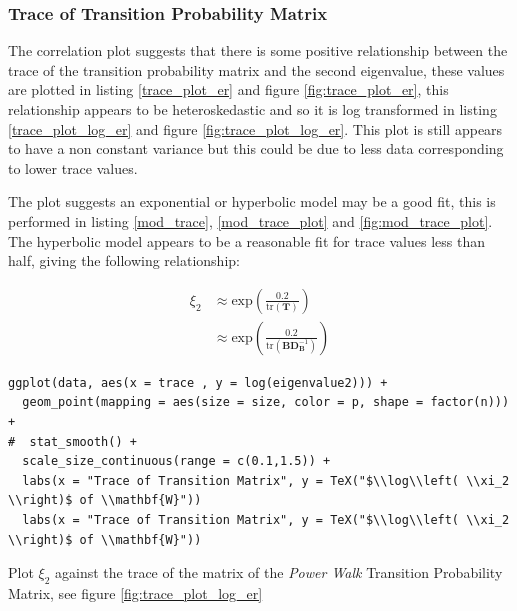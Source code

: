 \documentclass[11pt]{article}
\begin{document}
\subsubsection{Trace of Transition Probability Matrix}
\label{sec:orgc214bbb}
The correlation plot suggests that there is some positive relationship between
the trace of the transition probability matrix and the second eigenvalue, these
values are plotted in listing \ref{trace_plot_er} and figure \ref{fig:trace_plot_er}, this
relationship appears to be heteroskedastic and so it is log transformed in
listing \ref{trace_plot_log_er} and figure \ref{fig:trace_plot_log_er}. This plot is still appears to have a non constant variance but this could be due to less data corresponding to lower trace values.

The plot suggests an exponential or hyperbolic model may be a good fit, this is performed in listing \ref{mod_trace}, \ref{mod_trace_plot} and  \ref{fig:mod_trace_plot}. The hyperbolic model appears to be a reasonable fit for trace values less than half, giving the following relationship:


\begin{align}
\xi_{2} &\approx \mathrm{exp}\left( \frac{0.2}{\mathrm{tr}\left(\mathbf{T}\right)} \right) \\
	&\approx  \mathrm{exp} \left( \frac{0.2}{\mathrm{tr}\left( \mathbf{B}\mathbf{D}_{\mathbf{B}}^{- 1} \right)} \right) \label{eq:trace_lim}
\end{align}

\begin{listing}[htbp]
\begin{verbatim}
ggplot(data, aes(x = trace , y = log(eigenvalue2))) +
  geom_point(mapping = aes(size = size, color = p, shape = factor(n))) +
#  stat_smooth() +
  scale_size_continuous(range = c(0.1,1.5)) +
  labs(x = "Trace of Transition Matrix", y = TeX("$\\log\\left( \\xi_2 \\right)$ of \\mathbf{W}"))
  labs(x = "Trace of Transition Matrix", y = TeX("$\\log\\left( \\xi_2 \\right)$ of \\mathbf{W}"))
\end{verbatim}
\caption{\label{trace_plot_log_er}Plot \(\xi_{2}\) against the trace of the matrix of the \emph{Power Walk} Transition Probability Matrix, see figure \ref{fig:trace_plot_log_er}}
\end{listing}
\end{document}
